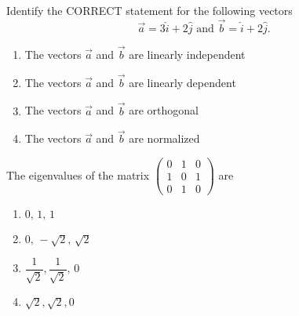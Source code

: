 \item Identify the CORRECT statement for the following vectors
\hfill{}
$$\vec{a}=3\hat{i}+2\hat{j} \text{ and } \vec{b}=\hat{i}+2\hat{j}.$$
\begin{enumerate}
\item The vectors $\vec{a}$ and $\vec{b}$ are linearly independent
\item The vectors $\vec{a}$ and $\vec{b}$ are linearly dependent
\item The vectors $\vec{a}$ and $\vec{b}$ are orthogonal
\item The vectors $\vec{a}$ and $\vec{b}$ are normalized
\end{enumerate}
\item The eigenvalues of the matrix
$
\begin{pmatrix}
0 & 1 & 0 \\
1 & 0 & 1\\
0 & 1 & 0
\end{pmatrix}
$
are
\hfill{}
\begin{multicols}{4}
\begin{enumerate}
\item $0,\,1,\,1$
\item $0,\,-\sqrt{2},\,\sqrt{2}$
\item $\dfrac{1}{\sqrt{2}},\dfrac{1}{\sqrt{2}},\,0$
\item $\sqrt{2},\sqrt{2},0$
\end{enumerate}
\end{multicols}
